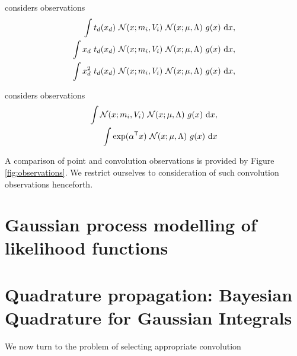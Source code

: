 \documentclass[twoside]{article}
\begin{document}
\ep considers observations
\begin{align}
 \int t_d(x_d)~\mathcal{N}(x;m_i,V_i)~\mathcal{N}(x;\mu,\Lambda)~g(x)~\mathrm{d} x,\\
  \int x_d~t_d(x_d)~\mathcal{N}(x;m_i,V_i)~\mathcal{N}(x;\mu,\Lambda)~g(x)~\mathrm{d} x,\\
 \int x_d^2~t_d(x_d)~\mathcal{N}(x;m_i,V_i)~\mathcal{N}(x;\mu,\Lambda)~g(x)~\mathrm{d} x,
\end{align}

\vb \citep{Gibbs_MacKay97b} considers observations
\begin{align}
 \int \mathcal{N}(x;m_i,V_i)~\mathcal{N}(x;\mu,\Lambda)~g(x)~\mathrm{d} x,\\
\int \exp(\alpha^\mathsf{T} x)~\mathcal{N}(x;\mu,\Lambda)~g(x)~\mathrm{d} x
\end{align}



A comparison of point and convolution observations is provided by Figure \ref{fig:observations}. 
We restrict ourselves to consideration of such convolution observations henceforth.

\section{Gaussian process modelling of likelihood functions}

\begin{figure*}
\caption{}
\end{figure*}


\section{Quadrature propagation: Bayesian Quadrature for Gaussian Integrals}
\label{sec:active}

We now turn to the problem of selecting appropriate convolution 



\end{document}
